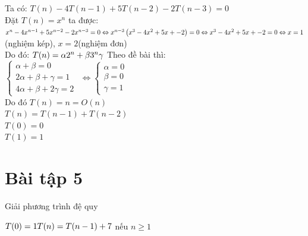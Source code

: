 \documentclass[12pt, a4paper, fleqn]{article}
\begin{document}
Ta có:
$T(n) - 4T(n - 1) + 5T(n - 2) - 2T(n - 3) = 0$\\
Đặt $T(n) = x ^ n$ ta được: \\
$x ^ n - 4x ^ {n - 1} + 5x ^ {n - 2} - 2x ^ {n - 3} = 0\\
\Leftrightarrow x ^ {n - 3}\left(x ^ 3 - 4x ^ 2 + 5x + - 2\right) = 0\\
\Leftrightarrow x ^ 3 - 4x ^ 2 + 5x + - 2 = 0\\
\Leftrightarrow x = 1$(nghiệm kép), $x = 2$(nghiệm đơn)\\
Do đó: $T(n) = \alpha2 ^ n + \beta3 ^ n\gamma\\$
Theo đề bài thì:\\
$
	\begin{cases}
	\alpha + \beta = 0\\
    2\alpha + \beta + \gamma = 1\\
    4\alpha + \beta + 2\gamma = 2
	\end{cases}
$
$\Leftrightarrow 
	\begin{cases}
	\alpha = 0\\
    \beta = 0\\
    \gamma = 1
	\end{cases}
$\\
Do đó $T(n) = n = O(n)$\\

	
$T(n) = T(n - 1) + T(n - 2)$\\
$T(0) = 0$\\
$T(1) = 1$

	
\clearpage

\section*{Bài tập 5}
Giải phương trình đệ quy

$T(0) = 1\\
T(n) = T(n - 1) + 7$ nếu $n \geq 1$
	
\end{document}
